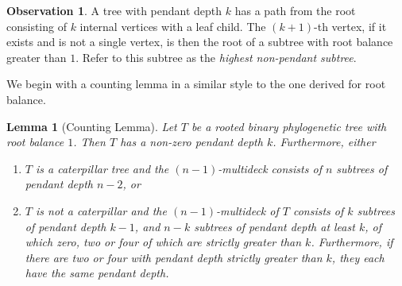 \documentclass[12pt]{article}
\newtheorem{Lemma}[Theorem]{Lemma}
\theoremstyle{definition}
\newtheorem{Observation}[Theorem]{Observation}
\begin{document}
\begin{Observation}
    A tree with pendant depth $k$ has a path from the root consisting of $k$ internal vertices with a leaf child. The $(k+1)$-th vertex, if it exists and is not a single vertex, is then the root of a subtree with root balance greater than $1$. Refer to this subtree as the \emph{highest non-pendant subtree}.
\end{Observation}

We begin with a counting lemma in a similar style to the one derived for root balance.

\begin{Lemma}[Counting Lemma]\label{pendant_depth_lemma}
    Let $T$ be a rooted binary phylogenetic tree with root balance $1$. Then $T$ has a non-zero pendant depth $k$. Furthermore, either 
    
    \begin{enumerate}
        \item $T$ is a caterpillar tree and the $(n-1)$-multideck consists of $n$ subtrees of pendant depth $n-2$, or
        \item $T$ is not a caterpillar and the $(n-1)$-multideck of $T$ consists of $k$ subtrees of pendant depth $k-1$, and $n-k$ subtrees of pendant depth at least $k$, of which zero, two or four of which are strictly greater than $k$. Furthermore, if there are two or four with pendant depth strictly greater than $k$, they each have the same pendant depth.
    \end{enumerate} 
\end{Lemma}
\end{document}
